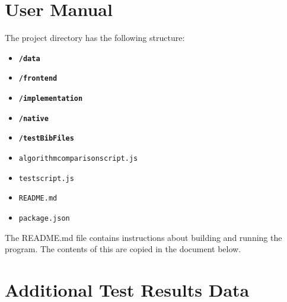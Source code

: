 \documentclass[a4paper,11pt]{article}
\newcommand{\code}[1]{\colorbox{codegray}{\texttt{#1}}}
\begin{document}
\section{User Manual}
The project directory has the following structure:
\begin{itemize}
    \item \code{\textbf{/data}}
    \item \code{\textbf{/frontend}}
    \item \code{\textbf{/implementation}}
    \item \code{\textbf{/native}}
    \item \code{\textbf{/testBibFiles}}
    \item \code{algorithm\textunderscore comparison\textunderscore script.js}
    \item \code{test\textunderscore script.js}
    \item \code{README.md}
    \item \code{package.json}
\end{itemize}
The README.md file contains instructions about building and running the program. The contents of this are copied in the document below.



\section{Additional Test Results Data}\label{appendix:testdata}
\end{document}
